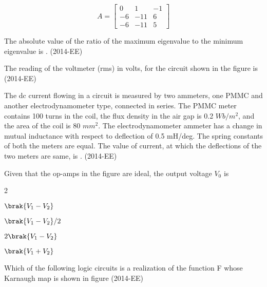 $$ A =    \begin{bmatrix}
    0     & 1  & -1 \\
    -6    &  -11 & 6 \\
  -6     &  -11 & 5
\end{bmatrix}$$

The absolute value  of the ratio of the maximum eigenvalue to the minimum eigenvalue is \underline{\hspace{2.5 cm}}.  \hfill{(2014-EE)}

\item The reading of the voltmeter (rms) in volts, for the circuit shown in the figure is \underline{\hspace{2.5 cm}}  \hfill{(2014-EE)}


\begin{center}

\end{center}




\item The dc current flowing in a circuit is measured by two ammeters, one PMMC and another
electrodynamometer type, connected in series. The PMMC meter contains 100 turns in the coil, the
flux density in the air gap is 0.2 $Wb/m^2$, and the area of the coil is 80 $mm^2$. The electrodynamometer
ammeter has a change in mutual inductance with respect to deflection of 0.5 mH/deg. The spring
constants of both the meters are equal. The value of current, at which the deflections of the two
meters are same, is \underline{\hspace{2.5 cm}}.  \hfill{(2014-EE)}
\\

\item Given that the op-amps in the figure are ideal, the output voltage $V_0$ is 
\begin{center}

\end{center}
	\begin{enumerate}
\end{enumerate}
\item Which of the following logic circuits is a realization of the function F whose Karnaugh map is
shown in figure \hfill{(2014-EE)}

